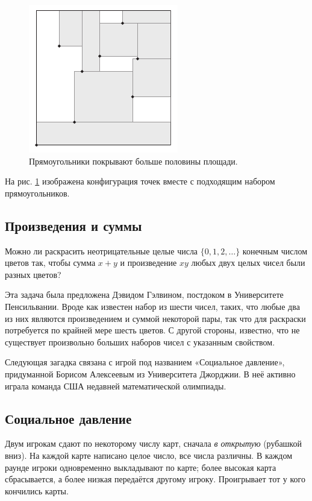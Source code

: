 \begin{figure}[htb!]
\centering
\includegraphics[scale=1]{pics/square}
\caption{Прямоугольники покрывают больше половины площади.}
\label{pic:square}
\end{figure}

На рис. \ref{pic:square} изображена конфигурация точек вместе с подходящим набором прямоугольников.

\subsection*{Произведения и суммы}

Можно ли раскрасить неотрицательные целые числа $\{0,1,2,\dots\}$ конечным числом цветов так, чтобы сумма $x+y$ и произведение $xy$ любых двух целых чисел были разных цветов?

\medskip

Эта задача была предложена Дэвидом Гэлвином, постдоком в Университете Пенсильвании.
Вроде как известен набор из шести чисел, таких, что любые два из них являются произведением и суммой некоторой пары, так что для раскраски потребуется по крайней мере шесть цветов.
С другой стороны, известно, что не существует произвольно больших наборов чисел с указанным свойством.

\medskip

Следующая загадка связана с игрой под названием «Социальное давление», придуманной Борисом Алексеевым из Университета Джорджии.
В неё активно играла команда США недавней математической олимпиады.

\subsection*{Социальное давление}

Двум игрокам сдают по некоторому числу карт, сначала \emph{в открытую} (рубашкой вниз).
На каждой карте написано целое число, все числа различны.
В каждом раунде игроки одновременно выкладывают по карте;
более высокая карта сбрасывается, а более низкая передаётся другому игроку.
Проигрывает тот у кого кончились карты.

